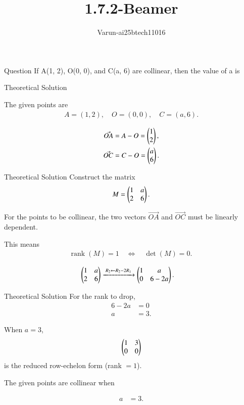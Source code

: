 \documentclass{beamer}
\title %
{1.7.2-Beamer}
\author %
{Varun-ai25btech11016}
\begin{document}
\frame{\titlepage}
\begin{frame}{Question}
If A(1, 2), O(0, 0), and C(a, 6) are collinear, then the value of a is

\end{frame}



\begin{frame}{Theoretical Solution }

 The given points are
\begin{align}
A = (1,2), \quad O = (0,0), \quad C = (a,6).
\end{align}

\begin{align}    
\Vec{OA}& = A - O = \begin{pmatrix}1 \\ 2\end{pmatrix},\\ 
 \Vec{OC} &= C - O = \begin{pmatrix}a \\ 6\end{pmatrix}.
\end{align}
\end{frame}
\begin{frame}{Theoretical Solution }
Construct the matrix
\begin{align} 
M = \begin{pmatrix}1 & a \\ 2 & 6\end{pmatrix}.
\end{align}

For the points to be collinear, the two vectors $\Vec{OA}$ and $\vec{OC}$ must be linearly dependent.



This means
\begin{align}
\operatorname{rank}(M) = 1 \quad \Leftrightarrow \quad \det(M) = 0. \
\end{align}



\begin{align}
\begin{pmatrix}1 & a \\ 2 & 6\end{pmatrix}
&\xrightarrow{\;R_2 \gets R_2 - 2R_1\;}
\begin{pmatrix}1 & a \\ 0 & 6 - 2a\end{pmatrix}.
\end{align}
\end{frame}
\begin{frame}{Theoretical Solution }
For the rank to drop,
\begin{align}
6 - 2a &= 0 \\
a &= 3. 
\end{align}

When $a=3$,
\[
\begin{pmatrix}1 & 3 \\ 0 & 0\end{pmatrix}
\]
is the reduced row-echelon form (rank $=1$).




The given points are collinear when

\begin{align}
a &= 3.
\end{align}

\end{frame}
\end{document}
